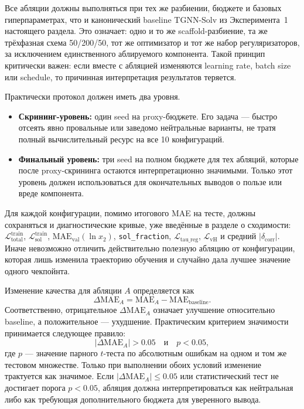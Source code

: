 \documentclass[11pt]{article}
\begin{document}
Все абляции должны выполняться при тех же разбиении, бюджете и базовых гиперпараметрах, что и канонический baseline TGNN-Solv из Эксперимента~1 настоящего раздела. Это означает: одно и то же scaffold-разбиение, та же трёхфазная схема 50/200/50, тот же оптимизатор и тот же набор регуляризаторов, за исключением единственного аблируемого компонента. Такой принцип критически важен: если вместе с абляцией изменяются learning rate, batch size или schedule, то причинная интерпретация результатов теряется.

Практически протокол должен иметь два уровня.
\begin{itemize}
  \item \textbf{Скрининг-уровень:} один seed на proxy-бюджете. Его задача --- быстро отсеять явно провальные или заведомо нейтральные варианты, не тратя полный вычислительный ресурс на все 10 конфигураций.
  \item \textbf{Финальный уровень:} три seed на полном бюджете для тех абляций, которые после proxy-скрининга остаются интерпретационно значимыми. Только этот уровень должен использоваться для окончательных выводов о пользе или вреде компонента.
\end{itemize}

Для каждой конфигурации, помимо итогового MAE на тесте, должны сохраняться и диагностические кривые, уже введённые в разделе о сходимости: $\mathcal{L}_{\mathrm{total}}^{\mathrm{train}}$, $\mathcal{L}_{\mathrm{sol}}^{\mathrm{train}}$, $\mathrm{MAE}_{\mathrm{val}}(\ln x_2)$, \texttt{sol\_fraction}, $\mathcal{L}_{\mathrm{tau\_reg}}$, $\mathcal{L}_{\mathrm{vH}}$ и средний $|\delta_{\mathrm{corr}}|$. Иначе невозможно отличить действительно полезную абляцию от конфигурации, которая лишь изменила траекторию обучения и случайно дала лучшее значение одного чекпойнта.

Изменение качества для абляции $A$ определяется как
\begin{equation*}
\Delta \mathrm{MAE}_A = \mathrm{MAE}_A - \mathrm{MAE}_{\mathrm{baseline}}.
\end{equation*}
Соответственно, отрицательное $\Delta \mathrm{MAE}_A$ означает улучшение относительно baseline, а положительное --- ухудшение. Практическим критерием значимости принимается следующее правило:
\begin{equation*}
|\Delta \mathrm{MAE}_A| > 0.05 \quad \text{и} \quad p < 0.05,
\end{equation*}
где $p$ --- значение парного $t$-теста по абсолютным ошибкам на одном и том же тестовом множестве. Только при выполнении обоих условий изменение трактуется как значимое. Если $|\Delta \mathrm{MAE}_A|\leq 0.05$ или статистический тест не достигает порога $p<0.05$, абляция должна интерпретироваться как нейтральная либо как требующая дополнительного бюджета для уверенного вывода.
\end{document}
